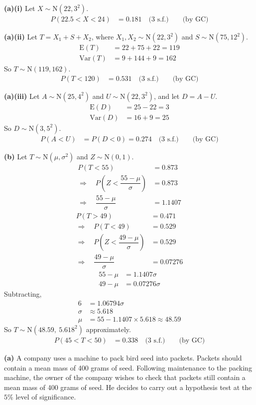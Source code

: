 \documentclass[a4paper,11pt,oneside]{article}
\newcommand{\Qhead}[1]{\par\needspace{14\baselineskip}\medskip\noindent{\large\bfseries #1}\par\smallskip}
\newcommand{\partlabel}[1]{\par\needspace{3\baselineskip}\smallskip\noindent\textbf{#1}\quad}
\begin{document}
\begin{solbox}
\partlabel{(a)(i)}
Let $X\sim\mathrm{N}(22,3^2)$.
\begin{align*}
P(22.5 < X < 24) &= 0.181\quad\text{(3 s.f.)}\qquad\text{(by GC)}
\end{align*}
\partlabel{(a)(ii)}
Let $T = X_1 + S + X_2$, where $X_1,X_2\sim\mathrm{N}(22,3^2)$ and $S\sim\mathrm{N}(75,12^2)$.
\begin{align*}
\mathrm{E}(T) &= 22 + 75 + 22 = 119\\
\mathrm{Var}(T) &= 9 + 144 + 9 = 162
\end{align*}
So $T\sim\mathrm{N}(119,162)$.
\begin{align*}
P(T < 120) &= 0.531\quad\text{(3 s.f.)}\qquad\text{(by GC)}
\end{align*}
\partlabel{(a)(iii)}
Let $A\sim\mathrm{N}(25,4^2)$ and $U\sim\mathrm{N}(22,3^2)$, and let $D = A - U$.
\begin{align*}
\mathrm{E}(D) &= 25 - 22 = 3\\
\mathrm{Var}(D) &= 16 + 9 = 25
\end{align*}
So $D\sim\mathrm{N}(3,5^2)$.
\begin{align*}
P(A < U) &= P(D < 0) = 0.274\quad\text{(3 s.f.)}\qquad\text{(by GC)}
\end{align*}
\partlabel{(b)}
Let $T\sim\mathrm{N}(\mu,\sigma^2)$ and $Z\sim\mathrm{N}(0,1)$.
\begin{align*}
P(T < 55) &= 0.873\\
\Rightarrow\quad P\!\left(Z < \dfrac{55-\mu}{\sigma}\right) &= 0.873\\
\Rightarrow\quad \dfrac{55-\mu}{\sigma} &= 1.1407
\end{align*}
\begin{align*}
P(T > 49) &= 0.471\\
\Rightarrow\quad P(T < 49) &= 0.529\\
\Rightarrow\quad P\!\left(Z < \dfrac{49-\mu}{\sigma}\right) &= 0.529\\
\Rightarrow\quad \dfrac{49-\mu}{\sigma} &= 0.07276
\end{align*}
\begin{align*}
55 - \mu &= 1.1407\sigma\\
49 - \mu &= 0.07276\sigma
\end{align*}
Subtracting,
\begin{align*}
6 &= 1.06794\sigma\\
\sigma &\approx 5.618\\
\mu &= 55 - 1.1407\times 5.618 \approx 48.59
\end{align*}
So $T\sim\mathrm{N}(48.59,\ 5.618^2)$ approximately.
\begin{align*}
P(45 < T < 50) &= 0.338\quad\text{(3 s.f.)}\qquad\text{(by GC)}
\end{align*}
\end{solbox}
\clearpage
\Qhead{11}
\partlabel{(a)}
A company uses a machine to pack bird seed into packets. Packets should contain a mean mass of 400 grams of seed. Following maintenance to the packing machine, the owner of the company wishes to check that packets still contain a mean mass of 400 grams of seed. He decides to carry out a hypothesis test at the $5\%$ level of significance.
\end{document}
